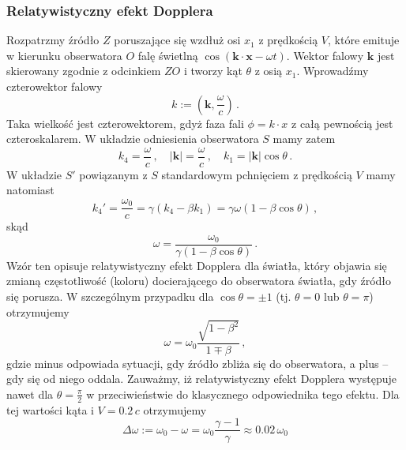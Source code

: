 \documentclass[../main.tex]{subfiles}
\begin{document}
\subsubsection{Relatywistyczny efekt Dopplera}
Rozpatrzmy źródło \(Z\) poruszające się wzdłuż osi \(x_1\) z prędkością \(V\), które emituje w
kierunku obserwatora \(O\) falę świetlną \(\cos(\mathbf{k}\cdot\mathbf{x}-\omega t)\). Wektor falowy
\(\mathbf{k}\) jest skierowany zgodnie z odcinkiem \(ZO\) i tworzy kąt \(\theta\) z osią \(x_1\).
Wprowadźmy czterowektor falowy
\begin{equation*}
    k:=\left(\mathbf{k},\frac{\omega}{c}\right)\,.
\end{equation*}
Taka wielkość jest czterowektorem, gdyż faza fali \(\phi=k\cdot x\) z całą pewnością jest
czteroskalarem. W układzie odniesienia obserwatora \(S\) mamy zatem
\begin{equation*}
    k_4=\frac{\omega}{c}\,,\quad |\mathbf{k}|=\frac{\omega}{c}\,,\quad k_1=|\mathbf{k}|\cos\theta\,.
\end{equation*}
W układzie \(S'\) powiązanym z \(S\) standardowym pchnięciem z prędkością \(V\) mamy natomiast
\begin{equation*}
    k_4'=\frac{\omega_0}{c}=\gamma(k_4-\beta k_1)=\gamma\omega(1-\beta\cos\theta)\,,
\end{equation*}
skąd
\begin{equation*}
    \omega=\frac{\omega_0}{\gamma(1-\beta\cos\theta)}\,.
\end{equation*}
Wzór ten opisuje relatywistyczny efekt Dopplera dla światła, który objawia się zmianą częstotliwość
(koloru) docierającego do obserwatora światła, gdy źródło się porusza. W szczególnym przypadku dla
\(\cos\theta=\pm 1\) (tj. \(\theta=0\) lub \(\theta=\pi\)) otrzymujemy
\begin{equation*}
    \omega=\omega_0\frac{\sqrt{1-\beta^2}}{1\mp\beta}\,,
\end{equation*}
gdzie minus odpowiada sytuacji, gdy źródło zbliża się do obserwatora, a plus -- gdy się od niego
oddala. Zauważmy, iż relatywistyczny efekt Dopplera występuje nawet dla \(\theta=\frac{\pi}{2}\) w
przeciwieństwie do klasycznego odpowiednika tego efektu. Dla tej wartości kąta i \(V=0.2\,c\)
otrzymujemy
\begin{equation*}
    \Delta\omega:=\omega_0-\omega=\omega_0\frac{\gamma-1}{\gamma}\approx 0.02\,\omega_0
\end{equation*}
\end{document}
